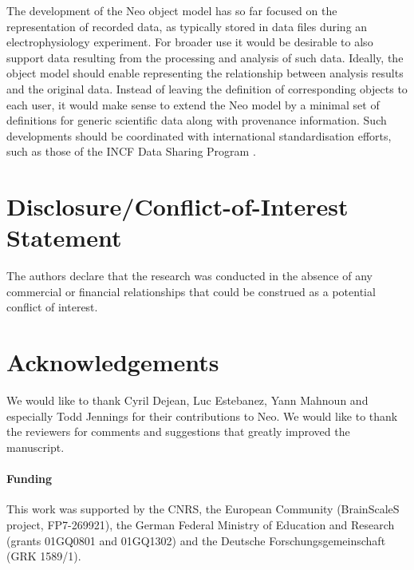 \documentclass{frontiers}
\begin{document}
The development of the Neo object model has so far focused on the representation of recorded data, as typically stored in data files during an electrophysiology experiment.
For broader use it would be desirable to also support data resulting from the processing and analysis of such data.
Ideally, the object model should enable representing the relationship between analysis results and the original data.
Instead of leaving the definition of corresponding objects to each user, it would make sense to extend the Neo model by a minimal set of definitions for generic scientific data along with provenance information.
Such developments should be coordinated with international standardisation efforts, such as those of the INCF Data Sharing Program \citep{Teeters2013}.

\section*{Disclosure/Conflict-of-Interest Statement}
The authors declare that the research was conducted in the absence of any commercial or financial relationships that could be construed as a potential conflict of interest.

\section*{Acknowledgements}
We would like to thank Cyril Dejean, Luc Estebanez, Yann Mahnoun and especially Todd Jennings for their contributions to Neo. We would like to thank the reviewers for comments and suggestions that greatly improved the manuscript.

\paragraph{Funding\textcolon} This work was supported by the CNRS, the European Community (BrainScaleS project, FP7-269921), the German Federal Ministry of Education and Research (grants 01GQ0801 and 01GQ1302) and the Deutsche Forschungsgemeinschaft (GRK 1589/1).


\end{document}
